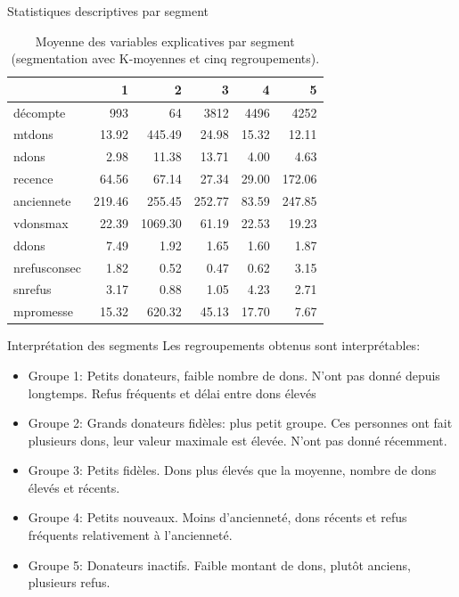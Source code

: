 \documentclass[
  ignorenonframetext,
]{beamer}
\providecommand{\tightlist}{%
  \setlength{\itemsep}{0pt}\setlength{\parskip}{0pt}}\usepackage{longtable,booktabs,array}
\begin{document}
\begin{frame}{Statistiques descriptives par segment}
\protect\hypertarget{statistiques-descriptives-par-segment}{}
\footnotesize

\hypertarget{tbl-kmoy5resume}{}
\begin{table}
\caption{\label{tbl-kmoy5resume}Moyenne des variables explicatives par segment (segmentation avec
K-moyennes et cinq regroupements). }\tabularnewline

\centering
\begin{tabular}{lrrrrr}
\toprule
  & 1 & 2 & 3 & 4 & 5\\
\midrule
décompte & 993 & 64 & 3812 & 4496 & 4252\\
mtdons & 13.92 & 445.49 & 24.98 & 15.32 & 12.11\\
ndons & 2.98 & 11.38 & 13.71 & 4.00 & 4.63\\
recence & 64.56 & 67.14 & 27.34 & 29.00 & 172.06\\
anciennete & 219.46 & 255.45 & 252.77 & 83.59 & 247.85\\
vdonsmax & 22.39 & 1069.30 & 61.19 & 22.53 & 19.23\\
ddons & 7.49 & 1.92 & 1.65 & 1.60 & 1.87\\
nrefusconsec & 1.82 & 0.52 & 0.47 & 0.62 & 3.15\\
snrefus & 3.17 & 0.88 & 1.05 & 4.23 & 2.71\\
mpromesse & 15.32 & 620.32 & 45.13 & 17.70 & 7.67\\
\bottomrule
\end{tabular}
\end{table}
\end{frame}

\begin{frame}{Interprétation des segments}
\protect\hypertarget{interpruxe9tation-des-segments}{}
Les regroupements obtenus sont interprétables:

\begin{itemize}
\tightlist
\item
  Groupe 1: Petits donateurs, faible nombre de dons. N'ont pas donné
  depuis longtemps. Refus fréquents et délai entre dons élevés
\item
  Groupe 2: Grands donateurs fidèles: plus petit groupe. Ces personnes
  ont fait plusieurs dons, leur valeur maximale est élevée. N'ont pas
  donné récemment.
\item
  Groupe 3: Petits fidèles. Dons plus élevés que la moyenne, nombre de
  dons élevés et récents.
\item
  Groupe 4: Petits nouveaux. Moins d'ancienneté, dons récents et refus
  fréquents relativement à l'ancienneté.
\item
  Groupe 5: Donateurs inactifs. Faible montant de dons, plutôt anciens,
  plusieurs refus.
\end{itemize}
\end{frame}
\end{document}

